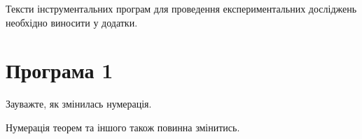 \label{appendix:A}

Тексти інструментальних програм для проведення експериментальних досліджень необхідно 
виносити у додатки.

\section{Програма 1}

Зауважте, як змінилась нумерація.

\begin{theorem}
Нумерація теорем та іншого також повинна змінитись.
\end{theorem}